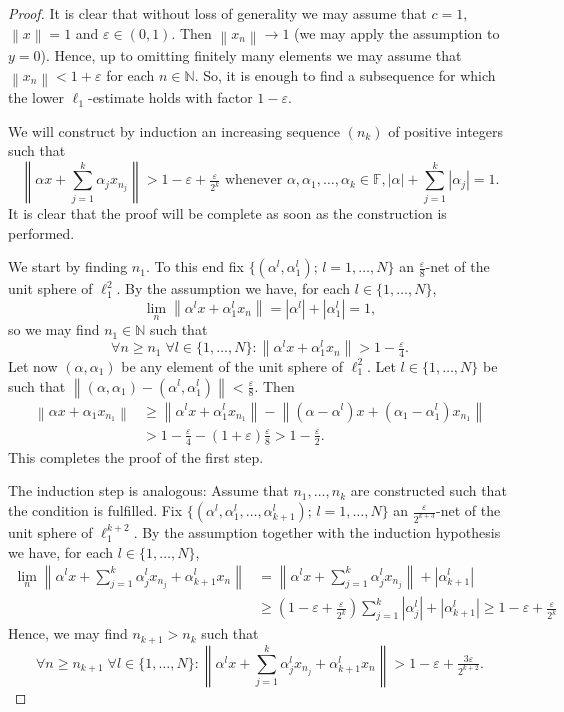 \documentclass{amsart}
\numberwithin{equation}{section}
\theoremstyle{definition}
\def\ep{\varepsilon}
\def\en{\mathbb N}
\def\ef{\mathbb F}
\newcommand{\norm}[1]{\left\|#1\right\|}
\newcommand{\abs}[1]{\left|#1\right|}
\newcommand{\setsep}{;\,}
\begin{document}
\begin{proof}
    It is clear that without loss of generality we may assume that $c=1$, $\norm{x}=1$ and $\ep\in(0,1)$. Then $\norm{x_n}\to1$ (we may apply the assumption to $y=0$). Hence, up to omitting finitely many elements we may assume that $\norm{x_n}<1+\ep$ for each $n\in\en$. So, it is enough to find a subsequence for which the lower $\ell_1$-estimate holds with factor $1-\ep$.

   We will construct by induction an increasing sequence $(n_k)$ of positive integers such that
   $$\norm{\alpha x+\sum_{j=1}^k\alpha_j x_{n_j}}>1-\ep+\tfrac{\ep}{2^k} \mbox{ whenever }\alpha,\alpha_1,\dots,\alpha_k\in\ef, \abs{\alpha}+\sum_{j=1}^k\abs{\alpha_j}=1.$$
   It is clear that the proof will be complete as soon as the construction is performed.

   We start by finding $n_1$. To this end fix $\{(\alpha^l,\alpha_1^l)\setsep l=1,\dots,N\}$ an
   $\frac{\ep}{8}$-net of the unit sphere of $\ell_1^2$. By the assumption we have, for each $l\in\{1,\dots,N\}$,
   $$\lim_n\norm{\alpha^l x+\alpha_1^l x_n}=\abs{\alpha^l}+\abs{\alpha_1^l}=1,$$
   so we may find $n_1\in\en$ such that
   $$\forall n\ge n_1\;\forall l\in\{1,\dots,N\}\colon \norm{\alpha^l x+\alpha_1^l x_n}>1-\tfrac{\ep}{4}.$$
   Let now $(\alpha,\alpha_1)$ be any element of the unit sphere of $\ell_1^2$. Let $l\in\{1,\dots,N\}$
   be such that $\norm{(\alpha,\alpha_1)-(\alpha^l,\alpha_1^l)}<\frac{\ep}{8}$. Then
   $$\begin{aligned}
   \norm{\alpha x+\alpha_1 x_{n_1}}&\ge \norm{\alpha^l x+\alpha_1^l x_{n_1}}-\norm{(\alpha-\alpha^l) x+(\alpha_1 -\alpha_1^l)x_{n_1}} \\&>1-\tfrac{\ep}{4}-(1+\ep)\tfrac{\ep}{8}>1-\tfrac{\ep}{2}.\end{aligned}$$
  This completes the proof of the first step.

   The induction step is analogous: Assume that $n_1,\dots,n_k$ are constructed such that the condition is fulfilled.   Fix $\{(\alpha^l,\alpha_1^l,\dots,\alpha_{k+1}^l)\setsep l=1,\dots,N\}$ an
   $\frac{\ep}{2^{k+3}}$-net of the unit sphere of $\ell_1^{k+2}$. By the assumption together with the induction hypothesis we have, for each $l\in\{1,\dots,N\}$,
   $$\begin{aligned}
       \lim_n\norm{\alpha^l x+\sum_{j=1}^k\alpha_j^l x_{n_j}+\alpha_{k+1}^l x_n}&=\norm{\alpha^l x+\sum_{j=1}^k\alpha_j^l x_{n_j}}+\abs{\alpha_{k+1}^l}\\
       &\ge (1-\ep+\tfrac{\ep}{2^k})\sum_{j=1}^k\abs{\alpha_j^l}+\abs{\alpha_{k+1}^l}\ge 1-\ep+\tfrac{\ep}{2^k}
      \end{aligned}$$
  Hence, we may find $n_{k+1}>n_k$ such that     
   $$\forall n\ge n_{k+1}\;\forall l\in\{1,\dots,N\}\colon \norm{\alpha^l x+\sum_{j=1}^k\alpha_j^l x_{n_j}+\alpha_{k+1}^l x_n}>1-\ep+\tfrac{3\ep}{2^{k+2}}.$$


\end{proof}
\end{document}
